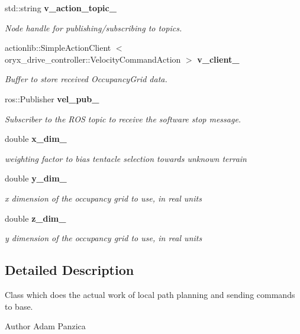\begin{DoxyCompactItemize}
std\-::string {\bf v\-\_\-action\-\_\-topic\-\_\-}
\begin{DoxyCompactList}\small\item\em \-Node handle for publishing/subscribing to topics. \end{DoxyCompactList}\item 
actionlib\-::\-Simple\-Action\-Client\*
$<$ oryx\-\_\-drive\-\_\-controller\-::\-Velocity\-Command\-Action $>$ {\bf v\-\_\-client\-\_\-}
\begin{DoxyCompactList}\small\item\em \-Buffer to store received \-Occupancy\-Grid data. \end{DoxyCompactList}\item 
ros\-::\-Publisher {\bf vel\-\_\-pub\-\_\-}
\begin{DoxyCompactList}\small\item\em \-Subscriber to the \-R\-O\-S topic to receive the software stop message. \end{DoxyCompactList}\item 
double {\bf x\-\_\-dim\-\_\-}
\begin{DoxyCompactList}\small\item\em weighting factor to bias tentacle selection towards unknown terrain \end{DoxyCompactList}\item 
double {\bf y\-\_\-dim\-\_\-}
\begin{DoxyCompactList}\small\item\em x dimension of the occupancy grid to use, in real units \end{DoxyCompactList}\item 
double {\bf z\-\_\-dim\-\_\-}
\begin{DoxyCompactList}\small\item\em y dimension of the occupancy grid to use, in real units \end{DoxyCompactList}\end{DoxyCompactItemize}


\subsection{\-Detailed \-Description}
\-Class which does the actual work of local path planning and sending commands to base. 

\begin{DoxyAuthor}{\-Author}
\-Adam \-Panzica 
\end{DoxyAuthor}


